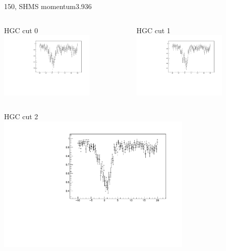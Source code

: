 \documentclass[aspectratio=169,xcolor=dvipsnames]{beamer}
\begin{document}
\begin{frame}{150, SHMS momentum3.936}
\begin{columns}
\begin{column}[T]{0.5\textwidth}
HGC cut 0 \\
\includegraphics[width = 0.7\textwidth]{results/pid/SHMS_hgcer_eff_6194_0.pdf}
\end{column}
\begin{column}[T]{0.5\textwidth}
HGC cut 1 \\
\includegraphics[width = 0.7\textwidth]{results/pid/SHMS_hgcer_eff_6194_1.pdf}
\end{column}
\end{columns}
\begin{columns}
\begin{column}[T]{0.5\textwidth}
HGC cut 2 \\
\includegraphics[width = 0.7\textwidth]{results/pid/SHMS_hgcer_eff_6194_2.pdf}

\end{column}
\end{columns}
\end{frame}
\end{document}
